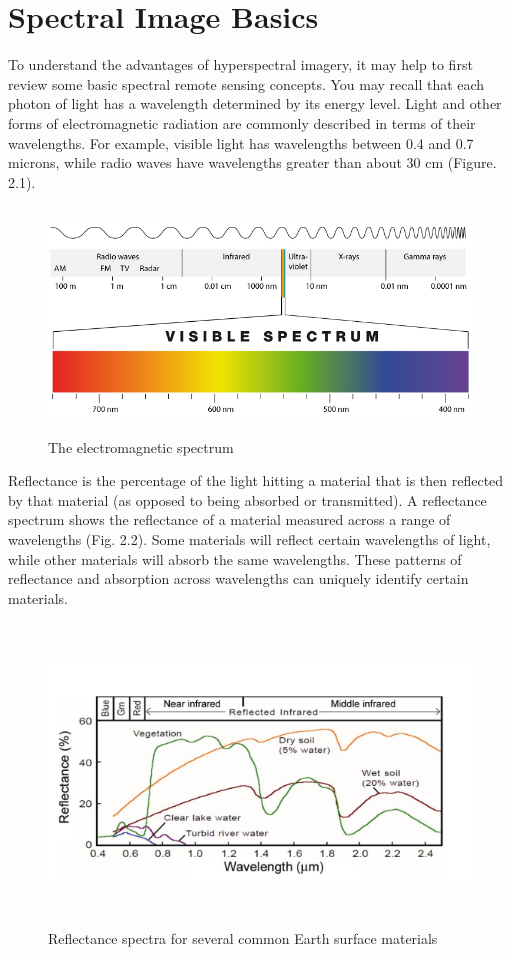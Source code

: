 \documentclass[document.tex]{subfiles}
\begin{document}
\section{Spectral Image Basics}
\noindent To understand the advantages of hyperspectral imagery, it may help to first review some
basic spectral remote sensing concepts. You may recall that each photon of light has
a wavelength determined by its energy level. Light and other forms of electromagnetic
radiation are commonly described in terms of their wavelengths. For example, visible
light has wavelengths between 0.4 and 0.7 microns, while radio waves have wavelengths
greater than about 30 cm (Figure. 2.1).
\begin{figure}[H]
	\begin{center}
		\includegraphics[height=6.0cm]{imgs/Electromagnetic_spectrum.png}
	\end{center}
	\caption{The electromagnetic spectrum}
	\label{fig: The electromagnetic spectrum}
\end{figure}
\noindent Reflectance is the percentage of the light hitting a material that is then reflected by
that material (as opposed to being absorbed or transmitted). A reflectance spectrum
shows the reflectance of a material measured across a range of wavelengths (Fig. 2.2).
Some materials will reflect certain wavelengths of light, while other materials will absorb
the same wavelengths. These patterns of reflectance and absorption across wavelengths
can uniquely identify certain materials.
\begin{figure}[H]
	\begin{center}
		\includegraphics[height=8.0cm]{imgs/Materials.png}
	\end{center}
	\caption{Reflectance spectra for several common Earth surface materials}
	\label{fig: Reflectance spectra for several common Earth surface materials}
\end{figure}
\end{document}
